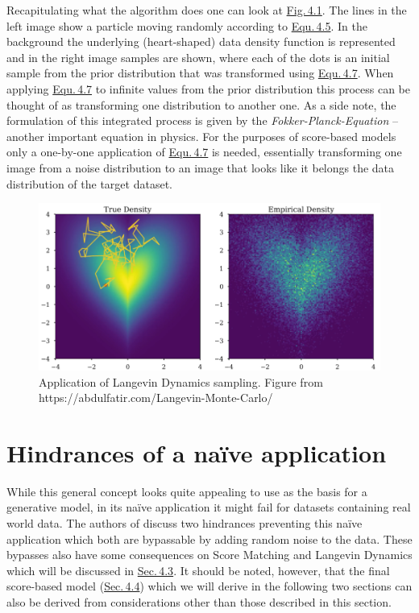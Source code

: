 Recapitulating what the algorithm does one can look at \hyperref[fig:4.1]{Fig.\,4.1}. The lines in the left image show a particle moving randomly according to \hyperref[equ:4.5]{Equ.\,4.5}. In the background the underlying (heart-shaped) data density function  is represented and in the right image samples are shown, where each of the dots is an initial sample from the prior distribution that was transformed using \hyperref[equ:4.7]{Equ.\,4.7}. When applying \hyperref[equ:4.7]{Equ.\,4.7} to infinite values from the prior distribution this process can be thought of as transforming one distribution to another one. As a side note, the formulation of this integrated process is given by the \textit{Fokker-Planck-Equation} \cite{gardiner} – another important equation in physics. For the purposes of score-based models only a one-by-one application of \hyperref[equ:4.7]{Equ.\,4.7} is needed, essentially transforming one image from a noise distribution to an image that looks like it belongs the data distribution of the target dataset.
%
\begin{figure}[] \label{fig:4.1}
    \centering
    \includegraphics[width=.8\textwidth]{Chapters/figures/langevin.PNG}
    \caption[Application of Langevin Dynamics sampling]{Application of Langevin Dynamics sampling. Figure from\\ https://abdulfatir.com/Langevin-Monte-Carlo/}
\end{figure}
\section{Hindrances of a na\"{i}ve application} \label{sec:4.2}
While this general concept looks quite appealing to use as the basis for a generative model, in its na\"{i}ve application it might fail for datasets containing real world data. The authors of \cite{score_1} discuss two hindrances preventing this na\"{i}ve application which both are bypassable by adding random noise to the data. These bypasses also have some consequences on Score Matching and Langevin Dynamics which will be discussed in \hyperref[sec:4.3]{Sec.\,4.3}. It should be noted, however, that the final score-based model (\hyperref[sec:4.4]{Sec.\,4.4}) which we will derive in the following two sections can also be derived from considerations other than those described in this section.
%
